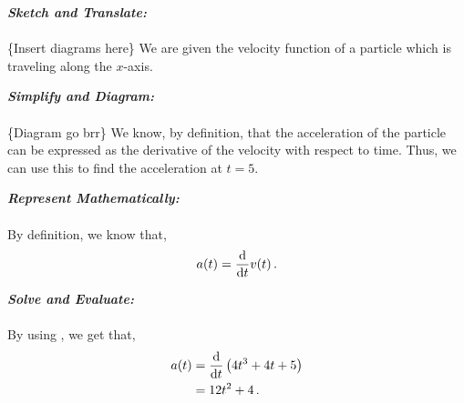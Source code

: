%
%
%


\begin{subquestions}
	
\subquestion

\begin{subsubquestions}
	
\subsubquestion

\textbf{\textit{Sketch and Translate:}} \\ \\
\{Insert diagrams here\}
We are given the velocity function of a particle which is traveling along the $x$-axis.




\textbf{\textit{Simplify and Diagram:}} \\ \\
\{Diagram go brr\}
We know, by definition, that the acceleration of the particle can be expressed as the derivative of the velocity with respect to time. Thus, we can use this to find the acceleration at $t=5$.




\textbf{\textit{Represent Mathematically:}} \\ \\
By definition, we know that,
\begin{equation}
	a(t) = \frac{\mathrm{d}}{\mathrm{d}t} v(t) \label{2005:q5:AEqn1} \,.
\end{equation}




\textbf{\textit{Solve and Evaluate:}} \\ \\
By using , we get that,
\begin{align}
	a(t) & = \frac{\mathrm{d}}{\mathrm{d}t} \left(4t^3 +4t +5\right) \nonumber \\
	     & = 12t^2 + 4 \,.
\end{align}


\end{subsubquestions}
\end{subquestions}
